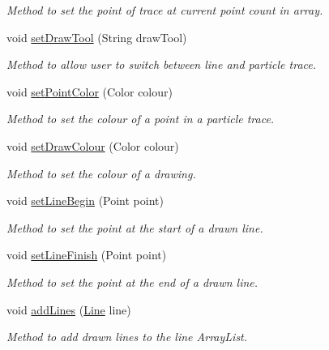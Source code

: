 \begin{DoxyCompactItemize}
\begin{DoxyCompactList}\small\item\em Method to set the point of trace at current point count in array. \end{DoxyCompactList}\item 
void \hyperlink{class_drawing_panel_a7fdcb0fc4a40945930517bdf664d6179}{set\+Draw\+Tool} (String draw\+Tool)
\begin{DoxyCompactList}\small\item\em Method to allow user to switch between line and particle trace. \end{DoxyCompactList}\item 
void \hyperlink{class_drawing_panel_a9e295a2f6aec0c5e85240324dff07d90}{set\+Point\+Color} (Color colour)
\begin{DoxyCompactList}\small\item\em Method to set the colour of a point in a particle trace. \end{DoxyCompactList}\item 
void \hyperlink{class_drawing_panel_a7b1a3aaefb7f62604525ebb494f6faa6}{set\+Draw\+Colour} (Color colour)
\begin{DoxyCompactList}\small\item\em Method to set the colour of a drawing. \end{DoxyCompactList}\item 
void \hyperlink{class_drawing_panel_a4efd38d997c0ddf31cc49ca18898484d}{set\+Line\+Begin} (Point point)
\begin{DoxyCompactList}\small\item\em Method to set the point at the start of a drawn line. \end{DoxyCompactList}\item 
void \hyperlink{class_drawing_panel_abf64c73a6dced3ea8183a2354a06cae7}{set\+Line\+Finish} (Point point)
\begin{DoxyCompactList}\small\item\em Method to set the point at the end of a drawn line. \end{DoxyCompactList}\item 
void \hyperlink{class_drawing_panel_abf082fafa7877579ae1bf1583e74cdd8}{add\+Lines} (\hyperlink{class_line}{Line} line)
\begin{DoxyCompactList}\small\item\em Method to add drawn lines to the line Array\+List. \end{DoxyCompactList}\item 

\end{DoxyCompactItemize}

